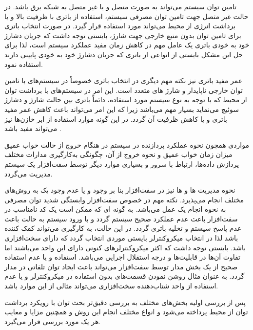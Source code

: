 تامین توان سیستم می‌تواند به صورت متصل و یا غیر متصل به شبکه برق باشد. در حالت غیر متصل جهت تامین توان مصرفی سیستم، استفاده از باتری با ظرفیت بالا و یا برداشت انرژی از محیط می‌تواند مورد استفاده قرار گیرد. در صورت انتخاب باتری برای تامین توان بدون منبع خارجی جهت شارژ، بایستی توجه داشت که جریان دشارژ خود به خودی باتری یک عامل مهم در کاهش زمان مفید عملکرد سیستم است، لذا برای حل این مشکل بایستی از انواعی از باتری که جریان دشارژ خود به خودی پایینی دارند استفاده نمود.

عمر مفید باتری نیز نکته مهم دیگری در انتخاب باتری خصوصاً در سیستم‌های با تامین توان خارجی ناپایدار و شارژ های متعدد است. این امر در سیستم‌های با برداشت توان از محیط که با توجه به نوع سیستم مورد استفاده، دائماً باتری بین حالت شارژ و دشارژ سوئیچ می‌نماید بسیار مهم می‌باشد زیرا که این امر می‌تواند باعث کاهش عمر مفید باتری و یا کاهش ظرفیت آن گردد. در این گونه موارد استفاده از ابر خازن‌ها نیز می‌تواند مفید باشد .




مواردی همچون نحوه عملکرد پردازنده در سیستم در هنگام خروج از حالت خواب عمیق میزان زمان خواب عمیق و نحوه خروج از آن، چگونگی به‌کارگیری مدارات مختلف پردازش داده‌ها، ارتباط با سرور و بسیاری موارد دیگر توسط سفت‌افزار یک سیستم مدیریت می‌گردد.

نحوه مدیریت  ها و  ها نیز در سفت‌افزار بنا بر وجود و یا عدم وجود یک  به روش‌های مختلف انجام می‌پذیرد. نکته مهم در خصوص سفت‌افزار وابستگی شدید توان مصرفی به نحوه انجام یک عمل می‌باشد. به گونه ای که ممکن است یک کد نامناسب در سفت‌افزار باعث عدم عملکرد صحیح سیستم گردد و با ورود سیستم به حالت  باعث عدم پاسخ سیستم و تخلیه باتری گردد. در این حالت، به کارگیری  می‌تواند کمک کننده باشد لذا در انتخاب میکروکنترلر بایستی موردی انتخاب گردد که دارای  سخت‌افزاری باشد. بایستی توجه داشت که اکثر میکروکنترلرهای کنونی دارای این واحد می‌باشند اما تفاوت آن‌ها در قابلیت‌ها و درجه استقلال اجرایی می‌باشد. استفاده و یا عدم استفاده صحیح از یک بخش مدار توسط سفت‌افزار می‌تواند باعث ایجاد توان تلفاتی در مدار گردد. به عنوان مثال روشن نمودن قسمت‌های بدون استفاده در میکروکنترلر و یا عدم استفاده از واحد شتاب‌دهنده سخت‌افزاری  می‌تواند مثالی از این موارد باشد.

پس از بررسی اولیه بخش‌های مختلف به بررسی دقیق‌تر بحث توان با رویکرد برداشت توان از محیط پرداخته می‌شود و انواع مختلف انجام این روش و همچنین مزایا و معایب هر یک مورد بررسی قرار می‌گیرد.
